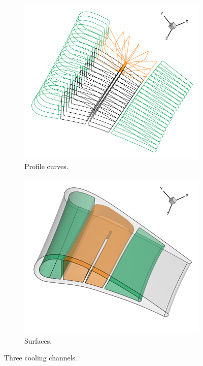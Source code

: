 \documentclass[a4paper, 11pt]{report}
\theoremstyle{definition}
\begin{document}
	\begin{figure}[H]
		\centering
		\begin{subfigure}{.49\textwidth}
			\includegraphics[width=\textwidth]{../tec/channel/13.png}
			\caption{Profile curves.}
		\end{subfigure}
		\begin{subfigure}{.49\textwidth}
			\includegraphics[width=\textwidth]{../tec/channel/14.png}
			\caption{Surfaces.}
		\end{subfigure}
		\caption{Three cooling channels.}
		\label{fig:threecoolingchannels}
	\end{figure}
\end{document}
